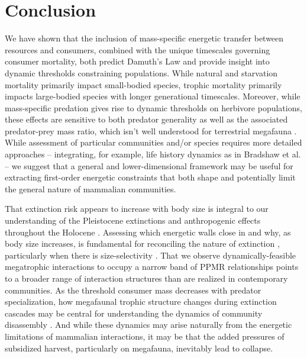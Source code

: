 \documentclass[]{rsos}%
\begin{document}
\section{Conclusion}
We have shown that the inclusion of mass-specific energetic transfer between resources and consumers, combined with the unique timescales governing consumer mortality, both predict Damuth's Law \cite{Damuth1987} and provide insight into dynamic thresholds constraining populations.
While natural and starvation mortality primarily impact small-bodied species, trophic mortality primarily impacts large-bodied species with longer generational timescales. 
Moreover, while mass-specific predation gives rise to dynamic thresholds on herbivore populations, these effects are sensitive to both predator generality as well as the associated predator-prey mass ratio, which isn't well understood for terrestrial megafauna \cite{nakazawa2017individual}.
While assessment of particular communities and/or species requires more detailed approaches -- integrating, for example, life history dynamics as in Bradshaw et al.  \cite{bradshaw2021relative} -- we suggest that a general and lower-dimensional framework may be useful for extracting first-order energetic constraints that both shape and potentially limit the general nature of mammalian communities.


That extinction risk appears to increase with body size \cite{Cardillo:2005et} is integral to our understanding of the Pleistocene extinctions \cite{alroy2001multispecies,johnson2002determinants,brook2008synergies,Smith:2018gm,bradshaw2021relative} and anthropogenic effects throughout the Holocene \cite{Estes:2011eo}.
Assessing which energetic walls close in and why, as body size increases, is fundamental for reconciling the nature of extinction \cite{brook2008synergies}, particularly when there is size-selectivity \cite{Smith:2018gm}.
That we observe dynamically-feasible megatrophic interactions to occupy a narrow band of PPMR relationships points to a broader range of interaction structures than are realized in contemporary communities.
As the threshold consumer mass decreases with predator specialization, how megafaunal trophic structure changes during extinction cascades may be central for understanding the dynamics of community disassembly \cite{Yeakel2014}.
And while these dynamics may arise naturally from the energetic limitations of mammalian interactions, it may be that the added pressures of subsidized harvest, particularly on megafauna, inevitably lead to collapse.
\end{document}
